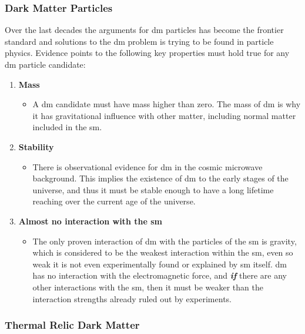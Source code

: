 \subsubsection{Dark Matter Particles}
\label{sec:dm_particles}

Over the last decades the arguments for \gls{dm} particles has become the frontier standard and solutions to the \gls{dm} problem is trying to be found in particle physics. Evidence points to the following key properties must hold true for any \gls{dm} particle candidate:

\begin{enumerate}
    \item \textbf{Mass}
    \begin{itemize}
        \item A \gls{dm} candidate must have mass higher than zero. The mass of \gls{dm} is why it has gravitational influence with other matter, including normal matter included in the \gls{sm}. 
    \end{itemize}
    \item \textbf{Stability}
    \begin{itemize}
        \item There is observational evidence for \gls{dm} in the cosmic microwave background. This implies the existence of \gls{dm} to the early stages of the universe, and thus it must be stable enough to have a long lifetime reaching over the current age of the universe.
    \end{itemize}
    \item \textbf{Almost no interaction with the \gls{sm}}
    \begin{itemize}
        \item The only proven interaction of \gls{dm} with the particles of the \gls{sm} is gravity, which is considered to be the weakest interaction within the \gls{sm}, even so weak it is not even experimentally found or explained by \gls{sm} itself. \gls{dm} has no interaction with the electromagnetic force, and \textbf{\textit{if}} there are any other interactions with the \gls{sm}, then it must be weaker than the interaction strengths already ruled out by experiments. 
    \end{itemize}
\end{enumerate}

\subsubsection{Thermal Relic Dark Matter}
\label{sec:termal_relic}


